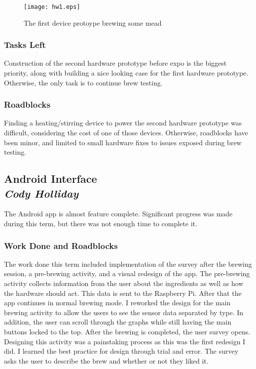 \documentclass[draftclsnofoot,onecolumn,letterpaper,10pt]{IEEEtran}
\begin{document}
\begin{figure}
\label{fig:hw1}
\caption{The first device protoype brewing some mead}
\texttt{[image: hw1.eps]}
\end{figure}

\subsubsection{Tasks Left}
Construction of the second hardware prototype before expo is the biggest priority, along
with building a nice looking case for the first hardware prototype.
Otherwise, the only task is to continue brew testing.

\subsubsection{Roadblocks}
Finding a heating/stirring device to power the second hardware prototype was difficult, considering
the cost of one of those devices.
Otherwise, roadblocks have been minor, and limited to small hardware fixes to issues exposed during
brew testing.

\subsection{Android Interface\\{\em\textbf{Cody Holliday}}}
The Android app is almost feature complete. Significant progress was made during this term, but there was not enough time to complete it.


\subsubsection{Work Done and Roadblocks}
The work done this term included implementation of the survey after the brewing session, a pre-brewing activity, and a visual redesign of the app.
The pre-brewing activity collects information from the user about the ingredients as well as how the hardware should act.
This data is sent to the Raspberry Pi. After that the app continues in normal brewing mode.
I reworked the design for the main brewing activity to allow the users to see the sensor data separated by type.
In addition, the user can scroll through the graphs while still having the main buttons locked to the top.
After the brewing is completed, the user survey opens. 
Designing this activity was a painstaking process as this was the first redesign I did. I learned the best practice for design through trial and error.
The survey asks the user to describe the brew and whether or not they liked it.
\end{document}
